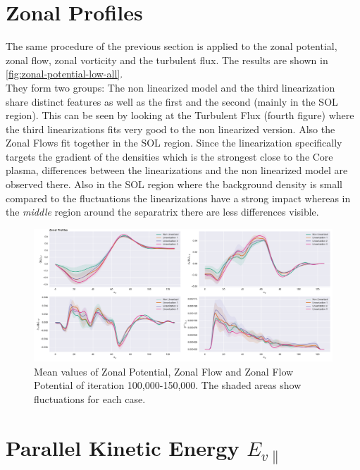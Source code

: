 \documentclass[master.tex]{subfiles}
\begin{document}
\section{Zonal Profiles}

The same procedure of the previous section is applied to the zonal potential, zonal flow, zonal vorticity and the turbulent flux. The results are shown in \autoref{fig:zonal-potential-low-all}.\\
They form two groups: The non linearized model and the third linearization share distinct features as well as the first and the second (mainly in the \ac{SOL} region). This can be seen by looking at the Turbulent Flux (fourth figure) where the third linearizations fits very good to the non linearized version. Also the Zonal Flows fit together in the \ac{SOL} region. Since the linearization specifically targets the gradient of the densities which is the strongest close to the Core plasma, differences between the linearizations and the non linearized model are observed there. Also in the \ac{SOL} region where the background density is small compared to the fluctuations the linearizations have a strong impact whereas in the \textit{middle} region around the separatrix there are less differences visible.

\begin{figure}[!htbp]
    \includegraphics[width=\linewidth]{pdfs/0-2_0-64/zonal-profiles-100000.pdf}
    \caption{Mean values of Zonal Potential, Zonal Flow and Zonal Flow Potential of iteration 100,000-150,000. The shaded areas show fluctuations for each case.}
    \label{fig:zonal-potential-low-all}
\end{figure}

\section{Parallel Kinetic Energy $E_{v\parallel}$}\label{sec:polar_parallel_velocities}
\end{document}
